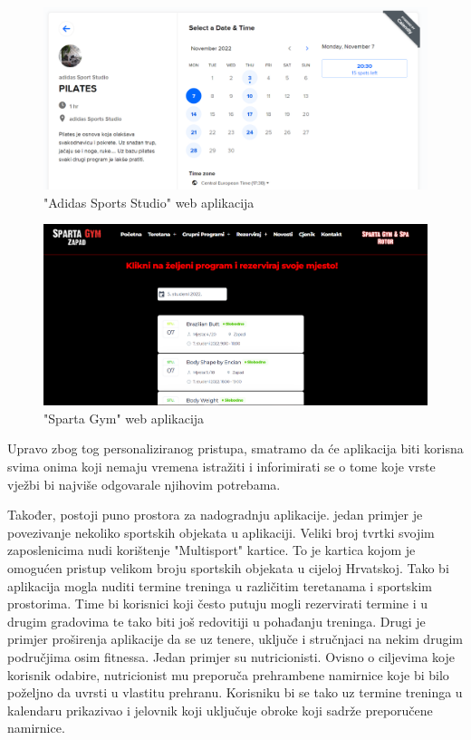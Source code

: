 		\begin{figure}[H]
			\includegraphics[scale=0.3]{slike/adidassportsstudio2.PNG} %
			\centering
			\caption{"Adidas Sports Studio" web aplikacija}
			\label{fig:adidassportsstudio2}
		\end{figure}
		
		\begin{figure}[H]
			\includegraphics[scale=0.3]{slike/spartagym1.PNG} %
			\centering
			\caption{"Sparta Gym" web aplikacija}
			\label{fig:spartagym1}
		\end{figure}
		
		{Upravo zbog tog personaliziranog pristupa, smatramo da će aplikacija biti korisna svima onima koji nemaju vremena istražiti i inforimirati se o tome koje vrste vježbi bi najviše odgovarale njihovim potrebama.} 
		
		{Također, postoji puno prostora za nadogradnju aplikacije. jedan primjer je povezivanje nekoliko sportskih objekata u aplikaciji. Veliki broj tvrtki svojim zaposlenicima nudi korištenje "Multisport" kartice. To je kartica kojom je omogućen pristup velikom broju sportskih objekata u cijeloj Hrvatskoj. Tako bi aplikacija mogla nuditi termine treninga u različitim teretanama i sportskim prostorima. Time bi korisnici koji često putuju mogli rezervirati termine i u drugim gradovima te tako biti još redovitiji u pohađanju treninga. Drugi je primjer proširenja aplikacije da se uz tenere, uključe i stručnjaci na nekim drugim područjima osim fitnessa. Jedan primjer su nutricionisti. Ovisno o ciljevima koje korisnik odabire, nutricionist mu preporuča prehrambene namirnice koje bi bilo poželjno da uvrsti u vlastitu prehranu. Korisniku bi se tako uz termine treninga u kalendaru prikazivao i  jelovnik koji uključuje obroke koji sadrže preporučene namirnice. }
		
		
		\eject
		
	